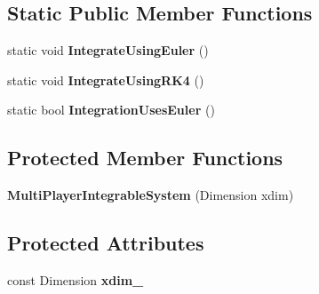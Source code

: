 \subsection*{Static Public Member Functions}
\begin{DoxyCompactItemize}
\item 
static void {\bfseries Integrate\+Using\+Euler} ()\hypertarget{classilqgames_1_1_multi_player_integrable_system_afbe59f8e51163913a0ef03b84bf6b33b}{}\label{classilqgames_1_1_multi_player_integrable_system_afbe59f8e51163913a0ef03b84bf6b33b}

\item 
static void {\bfseries Integrate\+Using\+R\+K4} ()\hypertarget{classilqgames_1_1_multi_player_integrable_system_a8623ddb41f2ea72b1838d5f8292fe091}{}\label{classilqgames_1_1_multi_player_integrable_system_a8623ddb41f2ea72b1838d5f8292fe091}

\item 
static bool {\bfseries Integration\+Uses\+Euler} ()\hypertarget{classilqgames_1_1_multi_player_integrable_system_a7d8d977e079520ad4eb6e2e38833b25c}{}\label{classilqgames_1_1_multi_player_integrable_system_a7d8d977e079520ad4eb6e2e38833b25c}

\end{DoxyCompactItemize}
\subsection*{Protected Member Functions}
\begin{DoxyCompactItemize}
\item 
{\bfseries Multi\+Player\+Integrable\+System} (Dimension xdim)\hypertarget{classilqgames_1_1_multi_player_integrable_system_a0c950b1732a06fe9b98392b3b83109f6}{}\label{classilqgames_1_1_multi_player_integrable_system_a0c950b1732a06fe9b98392b3b83109f6}

\end{DoxyCompactItemize}
\subsection*{Protected Attributes}
\begin{DoxyCompactItemize}
\item 
const Dimension {\bfseries xdim\+\_\+}\hypertarget{classilqgames_1_1_multi_player_integrable_system_ad6f5958f0f51492aa1d368765f417a19}{}\label{classilqgames_1_1_multi_player_integrable_system_ad6f5958f0f51492aa1d368765f417a19}

\end{DoxyCompactItemize}
